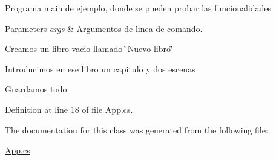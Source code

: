 Programa main de ejemplo, donde se pueden probar las funcionalidades 


\begin{DoxyParams}{Parameters}
{\em args} & Argumentos de linea de comando. \\
\hline
\end{DoxyParams}
Creamos un libro vacio llamado \char`\"{}\-Nuevo libro\char`\"{}

Introducimos en ese libro un capitulo y dos escenas

Guardamos todo 

Definition at line 18 of file App.\-cs.



The documentation for this class was generated from the following file\-:\begin{DoxyCompactItemize}
\item 
\hyperlink{_app_8cs}{App.\-cs}\end{DoxyCompactItemize}
